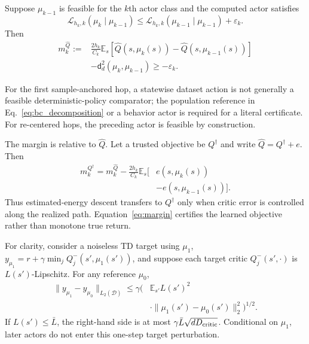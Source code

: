 \begin{proposition}
\label{prop:margin}
Suppose $\mu_{k-1}$ is feasible for the $k$th actor class and the computed
actor satisfies
\begin{equation*}
\mathcal L_{h_k,k}(\mu_k\mid\mu_{k-1})
\leq
\mathcal L_{h_k,k}(\mu_{k-1}\mid\mu_{k-1})+\varepsilon_k.
\end{equation*}
Then
\begin{equation}
\begin{split}
 m_k^{\widehat Q}:={}&
 \frac{2h_k}{C_k}\mathbb E_s
 [\widehat Q(s,\mu_k(s))-\widehat Q(s,\mu_{k-1}(s))]\\
 &-\mathsf d_d^2(\mu_k,\mu_{k-1})
 \geq-\varepsilon_k.
\end{split}
\label{eq:margin}
\end{equation}
\end{proposition}

For the first sample-anchored hop, a statewise dataset action is not generally
a feasible deterministic-policy comparator; the population reference in
Eq.~\eqref{eq:bc_decomposition} or a behavior actor is required for a literal
certificate. For re-centered hops, the preceding actor is feasible by
construction.

The margin is relative to $\widehat Q$. Let a trusted objective be
$Q^\dagger$ and write $\widehat Q=Q^\dagger+e$. Then
\begin{equation}
\begin{split}
 m_k^{Q^\dagger}=m_k^{\widehat Q}
 -\frac{2h_k}{C_k}\mathbb E_s[&e(s,\mu_k(s))\\
 &-e(s,\mu_{k-1}(s))].
\end{split}
\label{eq:critic_error_margin}
\end{equation}
Thus estimated-energy descent transfers to $Q^\dagger$ only when critic error
is controlled along the realized path. Equation~\eqref{eq:margin} certifies
the learned objective rather than monotone true return.

\begin{proposition}
\label{prop:exposure}
For clarity, consider a noiseless TD target using $\mu_1$,
$y_{\mu_1}=r+\gamma\min_jQ_j^-(s',\mu_1(s'))$, and suppose each target critic
$Q_j^-(s',\cdot)$ is $L(s')$-Lipschitz. For any reference $\mu_0$,
\begin{equation}
\begin{split}
\|y_{\mu_1}-y_{\mu_0}\|_{L_2(\mathcal D)}
\leq\gamma\Big(&\mathbb E_{s'}L(s')^2\\
&\cdot\|\mu_1(s')-\mu_0(s')\|_2^2\Big)^{1/2}.
\end{split}
\label{eq:exposure_bound}
\end{equation}
If $L(s')\leq\bar L$, the right-hand side is at most
$\gamma\bar L\sqrt{dD_{\rm critic}}$. Conditional on $\mu_1$, later actors do
not enter this one-step target perturbation.
\end{proposition}

